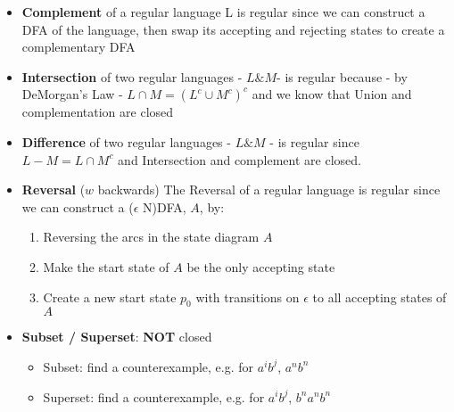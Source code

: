 \begin{itemize}
\begin{itemize}
\item \textbf{Complement} of a regular language L is regular since we can
  construct a DFA of the language, then swap its accepting and rejecting
  states to create a complementary DFA
\item \textbf{Intersection} of two regular languages - $L \& M $- is
  regular because - by DeMorgan's Law - $L \cap M = (L^c \cup M^c)^c$
  and we know that Union and complementation are closed
\item \textbf{Difference} of two regular languages - $L \& M$ - is
  regular since  $L - M = L \cap M^c$ and Intersection and complement are
  closed.  

\item \textbf{Reversal} ($w$ backwards) The Reversal of a regular language
	is regular since we can construct a ($\epsilon$ N)DFA, $A$, by:
	\begin{enumerate}
		\item Reversing the arcs in the state diagram $A$
		\item Make the start state of $A$ be the only accepting state 
		\item Create a new start state $p_0$ with transitions on $\epsilon$ to
		all accepting states of $A$
	\end{enumerate}
\item \textbf{Subset / Superset}: \textbf{NOT} closed
\begin{itemize}
	\item Subset: find a counterexample, e.g. for $a^ib^j$, $a^nb^n$
 	\item Superset: find a counterexample, e.g. for $a^ib^j$, $b^na^nb^n$
\end{itemize}
\end{itemize}


\end{itemize}
